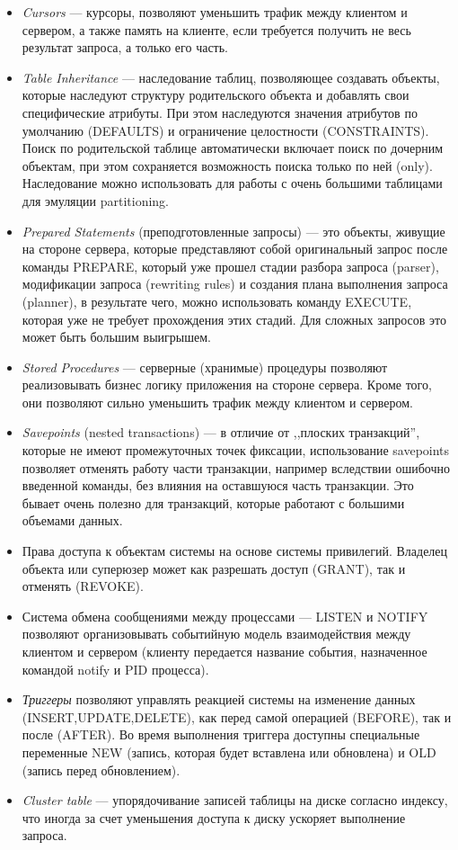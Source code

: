 \documentclass[a4paper,12pt,notitlepage,headsepline,pdftex]{scrartcl}
\begin{document}
\begin{itemize}
    \item \emph{Cursors} --- курсоры, позволяют уменьшить трафик между
      клиентом и сервером, а также память на клиенте, если требуется
      получить не весь результат запроса, а только его часть.
    \item \emph{Table Inheritance} --- наследование таблиц, позволяющее
      создавать объекты, которые наследуют структуру родительского объекта и
      добавлять свои специфические атрибуты.
      При этом наследуются значения атрибутов по умолчанию (DEFAULTS) и
      ограничение целостности (CONSTRAINTS).
      Поиск по родительской таблице автоматически включает поиск по дочерним
      объектам, при этом сохраняется возможность поиска только по ней
      (only).
      Наследование можно использовать для работы с очень большими таблицами
      для эмуляции partitioning.
    \item \emph{Prepared Statements} (преподготовленные запросы) --- это
      объекты, живущие на стороне сервера, которые представляют собой
      оригинальный запрос после команды PREPARE, который уже прошел стадии
      разбора запроса (parser), модификации запроса (rewriting rules) и
      создания плана выполнения запроса (planner), в результате чего, можно
      использовать команду EXECUTE, которая уже не требует прохождения этих
      стадий.
      Для сложных запросов это может быть большим выигрышем.
    \item \emph{Stored Procedures} --- серверные (хранимые) процедуры
      позволяют реализовывать бизнес логику приложения на стороне сервера.
      Кроме того, они позволяют сильно уменьшить трафик между клиентом и
      сервером.
    \item \emph{Savepoints} (nested transactions) --- в отличие от ,,плоских
      транзакций'', которые не имеют промежуточных точек фиксации,
      использование savepoints позволяет отменять работу части транзакции,
      например вследствии ошибочно введенной команды, без влияния на
      оставшуюся часть транзакции.
      Это бывает очень полезно для транзакций, которые работают с большими
      объемами данных.
    \item Права доступа к объектам системы на основе системы привилегий.
      Владелец объекта или суперюзер может как разрешать доступ (GRANT), так
      и отменять (REVOKE).
    \item Система обмена сообщениями между процессами --- LISTEN и NOTIFY
      позволяют организовывать событийную модель взаимодействия между
      клиентом и сервером (клиенту передается название события, назначенное
      командой notify и PID процесса).
    \item \emph{Триггеры} позволяют управлять реакцией системы на изменение
      данных (INSERT,UPDATE,DELETE), как перед самой операцией (BEFORE), так
      и после (AFTER).
      Во время выполнения триггера доступны специальные переменные NEW
      (запись, которая будет вставлена или обновлена) и OLD (запись перед
      обновлением).
    \item \emph{Cluster table} --- упорядочивание записей таблицы на диске
      согласно индексу, что иногда за счет уменьшения доступа к диску
      ускоряет выполнение запроса.
  \end{itemize}\cite{highperf}
\end{document}
